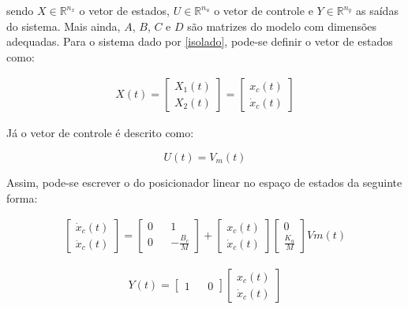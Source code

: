 \noindent sendo $X \in \mathbb{R}^{n_x}$ o vetor de estados, $U \in \mathbb{R}^{n_u}$ o vetor de controle e $Y \in \mathbb{R}^{n_y}$ as saídas do sistema. Mais ainda, $A$, $B$, $C$ e $D$ são matrizes do modelo com dimensões adequadas. Para o sistema dado por \eqref{isolado}, pode-se definir o vetor de estados como:

\begin{gather}
    X(t)= 
    \begin{bmatrix}
        X_1(t) \\ X_2(t) 
    \end{bmatrix}=
    \begin{bmatrix}
        x_c(t) \\ \dot{x}_c(t)
    \end{bmatrix}
    \label{vetor_estados}
\end{gather}

Já o vetor de controle é descrito como:

\begin{equation}
    U(t)=V_m(t)
    \label{vetor_controle}
\end{equation}

Assim, pode-se escrever o do posicionador linear no espaço de estados da seguinte forma:

\begin{gather}
    \begin{bmatrix}
        \dot{x}_c(t) \\ \ddot{x}_c(t)
    \end{bmatrix}=
    \begin{bmatrix}
        0 && 1 \\ 0 && -\frac{B_c}{M}
    \end{bmatrix}
    +
    \begin{bmatrix}
        x_c(t) \\ \dot{x}_c(t)
    \end{bmatrix}
    \begin{bmatrix}
        0 \\ \frac{K_a}{M}
    \end{bmatrix}
    Vm(t)
    \label{espaco_estados}
\end{gather}

\begin{gather}
    Y(t)=
    \begin{bmatrix}
        1 && 0
    \end{bmatrix}
    \begin{bmatrix}
        x_c(t) \\ \dot{x}_c(t)
    \end{bmatrix}
    \label{espaco_estados_saida}
\end{gather}

